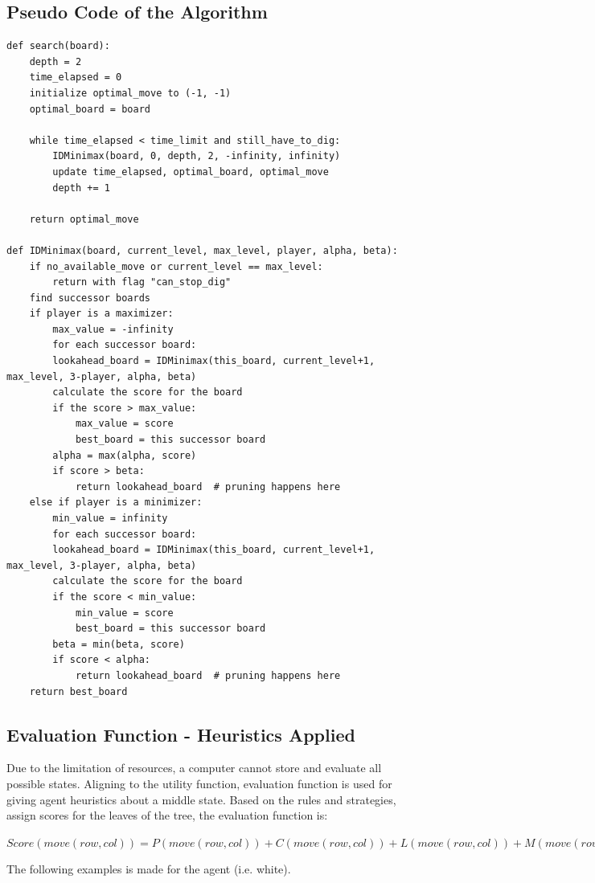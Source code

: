 \documentclass[letterpaper,12pt]{article}
\begin{document}
\subsection{Pseudo Code of the Algorithm}
\begin{lstlisting}
def search(board):
	depth = 2
	time_elapsed = 0
	initialize optimal_move to (-1, -1)
	optimal_board = board

	while time_elapsed < time_limit and still_have_to_dig:
		IDMinimax(board, 0, depth, 2, -infinity, infinity)
		update time_elapsed, optimal_board, optimal_move
		depth += 1
    
	return optimal_move

def IDMinimax(board, current_level, max_level, player, alpha, beta):
	if no_available_move or current_level == max_level:
    	return with flag "can_stop_dig"
	find successor boards
	if player is a maximizer:
		max_value = -infinity
		for each successor board:
		lookahead_board = IDMinimax(this_board, current_level+1, max_level, 3-player, alpha, beta)
		calculate the score for the board
		if the score > max_value:
			max_value = score
			best_board = this successor board
		alpha = max(alpha, score)
		if score > beta:
			return lookahead_board  # pruning happens here
	else if player is a minimizer:
		min_value = infinity
		for each successor board:
		lookahead_board = IDMinimax(this_board, current_level+1, max_level, 3-player, alpha, beta)
		calculate the score for the board
		if the score < min_value:
			min_value = score
			best_board = this successor board
		beta = min(beta, score)
		if score < alpha:
			return lookahead_board  # pruning happens here
	return best_board
\end{lstlisting}

\subsection{Evaluation Function - Heuristics Applied}

Due to the limitation of resources, a computer cannot store and evaluate all possible states. Aligning to the utility function, evaluation function is used for giving agent heuristics about a middle state. Based on the rules and strategies, assign scores for the leaves of the tree, the evaluation function is:

\begin{center}
$Score(move(row, col)) = P(move(row, col)) + C(move(row, col)) + L(move(row, col)) + M(move(row, col)) + S(move(row, col))$
\end{center}
\noindent
The following examples is made for the agent (i.e. white).
\end{document}
